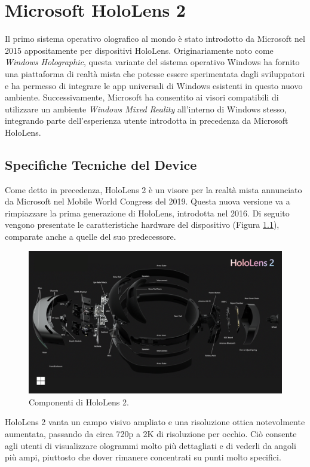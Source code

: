 \chapter{Microsoft HoloLens 2}
Il primo sistema operativo olografico al mondo è stato introdotto da Microsoft nel 2015 appositamente per dispositivi HoloLens.
Originariamente noto come \textit{Windows Holographic}, questa variante del sistema operativo Windows ha fornito una piattaforma di realtà mista che potesse essere sperimentata dagli sviluppatori e ha permesso di integrare le app universali di Windows esistenti in questo nuovo ambiente.
Successivamente, Microsoft ha consentito ai visori compatibili di utilizzare un ambiente \textit{Windows Mixed Reality} all'interno di Windows stesso, integrando parte dell'esperienza utente introdotta in precedenza da Microsoft HoloLens.

\section{Specifiche Tecniche del Device}\label{sec:Sezione2.1}

Come detto in precedenza, HoloLens 2 è un visore per la realtà mista annunciato da Microsoft nel Mobile World Congress del 2019.
Questa nuova versione va a rimpiazzare la prima generazione di HoloLens, introdotta nel 2016.
Di seguito vengono presentate le caratteristiche hardware del dispositivo (Figura \ref{fig:figure2}), comparate anche a quelle del suo predecessore.

\begin{figure}[t]
    \centering
    \includegraphics[width=\textwidth]{images/hololens2-breakdown.png}
    \caption{Componenti di HoloLens 2.}
    \label{fig:figure2}
\end{figure}

HoloLens 2 vanta un campo visivo ampliato e una risoluzione ottica notevolmente aumentata, passando da circa 720p a 2K di risoluzione per occhio. Ciò consente agli utenti di visualizzare ologrammi molto più dettagliati e di vederli da angoli più ampi, piuttosto che dover rimanere concentrati su punti molto specifici.

